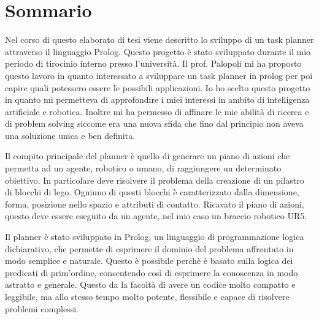 \chapter*{Sommario} %
\label{sommario}


Nel corso di questo elaborato di tesi viene descritto lo sviluppo di un task planner attraverso il linguaggio Prolog.
Questo progetto è stato sviluppato durante il mio periodo di tirocinio interno presso l'università.
Il prof. Palopoli mi ha proposto questo lavoro in quanto interessato a sviluppare un task planner in prolog per poi capire quali potessero essere le possibili applicazioni.
Io ho scelto questo progetto in quanto mi permetteva di approfondire i miei interessi in ambito di intelligenza artificiale e robotica.
Inoltre mi ha permesso di affinare le mie abilità di ricerca e di problem solving siccome era una nuova sfida che fino dal principio non aveva una soluzione unica e ben definita.  

Il compito principale del planner è quello di generare un piano di azioni che permetta ad un agente, robotico o umano, di raggiungere un determinato obiettivo.
In particolare deve risolvere il problema della creazione di un pilastro di blocchi di lego. Ogniuno di questi blocchi è caratterizzato dalla dimensione, forma, posizione nello spazio e attributi di contatto.
Ricavato il piano di azioni, questo deve essere eseguito da un agente, nel mio caso un braccio robotico UR5. 

Il planner è stato sviluppato in Prolog, un linguaggio di programmazione logica dichiarativo, che permette di esprimere il dominio del problema affrontato in modo semplice e naturale.
Questo è possibile perchè è basato sulla logica dei predicati di prim'ordine, consentendo così di esprimere la conoscenza in modo astratto e generale.
Questo da la facoltà di avere un codice molto compatto e leggibile, ma allo stesso tempo molto potente, flessibile e capace di risolvere problemi complessi.

